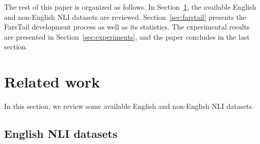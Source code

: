 \documentclass[preprint,12pt]{elsarticle}
\begin{document}
The rest of this paper is organized as follows. In Section~\ref{sec:literature}, the available English and non-English NLI datasets are reviewed. Section~\ref{sec:farstail} presents the FarsTail development process as well as its statistics. The experimental results are presented in Section~\ref{sec:experiments}, and the paper concludes in the last section. 

\section{Related work}
\label{sec:literature}
In this section, we review some available English and non-English NLI datasets. 

\subsection{English NLI datasets}
\end{document}

